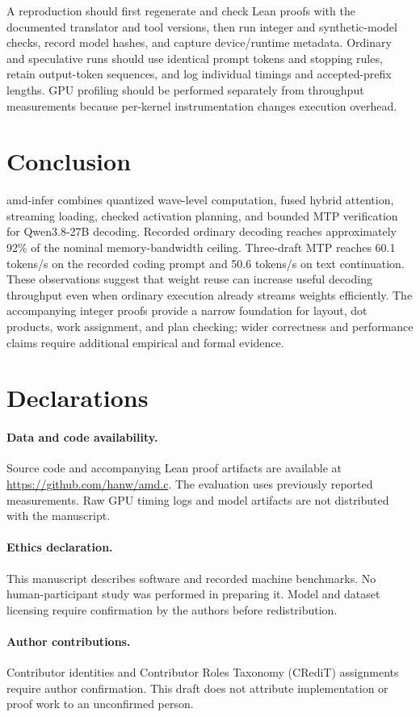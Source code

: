 \documentclass[10pt]{article}
\begin{document}
A reproduction should first regenerate and check Lean proofs with the documented translator and tool versions, then run integer and synthetic-model checks, record model hashes, and capture device/runtime metadata. Ordinary and speculative runs should use identical prompt tokens and stopping rules, retain output-token sequences, and log individual timings and accepted-prefix lengths. GPU profiling should be performed separately from throughput measurements because per-kernel instrumentation changes execution overhead.

\section{Conclusion}
amd-infer combines quantized wave-level computation, fused hybrid attention, streaming loading, checked activation planning, and bounded MTP verification for Qwen3.8-27B decoding. Recorded ordinary decoding reaches approximately 92\% of the nominal memory-bandwidth ceiling. Three-draft MTP reaches 60.1 tokens/s on the recorded coding prompt and 50.6 tokens/s on text continuation. These observations suggest that weight reuse can increase useful decoding throughput even when ordinary execution already streams weights efficiently. The accompanying integer proofs provide a narrow foundation for layout, dot products, work assignment, and plan checking; wider correctness and performance claims require additional empirical and formal evidence.

\section*{Declarations}
\paragraph{Data and code availability.} Source code and accompanying Lean proof artifacts are available at \url{https://github.com/hanw/amd.c}. The evaluation uses previously reported measurements. Raw GPU timing logs and model artifacts are not distributed with the manuscript.
\paragraph{Ethics declaration.} This manuscript describes software and recorded machine benchmarks. No human-participant study was performed in preparing it. Model and dataset licensing require confirmation by the authors before redistribution.
\paragraph{Author contributions.} Contributor identities and Contributor Roles Taxonomy (CRediT) assignments require author confirmation. This draft does not attribute implementation or proof work to an unconfirmed person.
\end{document}
